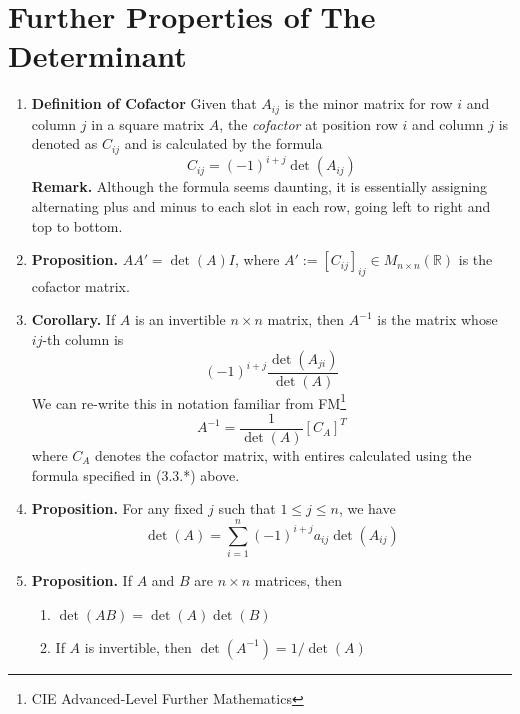 \documentclass[oneside, 12pt]{book}
\newcommand{\settag}[1]{\renewcommand{\theenumi}{#1}}
\newcommand{\R}{\mathbb{R}}
\newcommand{\tbf}[1]{\textbf{#1}}
\newcommand{\tit}[1]{\textit{#1}}
\newcommand{\para}[1]{\item \tbf{#1}}
\begin{document}
\section{Further Properties of The Determinant} 
\begin{enumerate}
    \settag{3.3.*}
    \para{Definition of Cofactor} Given that $A_{ij}$ is the minor matrix for row $i$ and column $j$ in a square matrix $A$, the \tit{cofactor} at position row $i$ and column $j$ is denoted as $C_{ij}$ and is calculated by the formula 
    \begin{equation*}
        C_{ij}=(-1)^{i+j}\det(A_{ij})
    \end{equation*}
    \tbf{Remark.} Although the formula seems daunting, it is essentially assigning alternating plus and minus to each slot in each row, going left to right and top to bottom.

    \settag{3.3.1}
    \para{Proposition.} $AA'=\det(A)I$, where $A':=\left[ C_{ij} \right]_{ij} \in M_{n \times n}(\R)$ is the cofactor matrix.
    
    \settag{3.3.2}
    \para{Corollary.} If $A$ is an invertible $n \times n$ matrix, then $A^{-1}$ is the matrix whose $ij$-th column is
    \begin{equation*}
        (-1)^{i+j}\frac{\det(A_{ji})}{\det(A)}
    \end{equation*}
    We can re-write this in notation familiar from FM\footnote{CIE Advanced-Level Further Mathematics}
    \begin{equation*}
        A^{-1} = \frac{1}{\det(A)}\left[C_A\right]^T
    \end{equation*}
    where $C_A$ denotes the cofactor matrix, with entires calculated using the formula specified in (3.3.*) above.
    
    \settag{3.3.4}
    \para{Proposition.} For any fixed $j$ such that $1 \leq j \leq n$, we have
    \begin{equation*}
        \det(A) = \sum_{i=1}^{n}(-1)^{i+j}a_{ij}\det(A_{ij})
    \end{equation*}
    
    \settag{3.3.7}
    \para{Proposition.} If $A$ and $B$ are $n\times n$ matrices, then
    \begin{enumerate}
        \item $\det(AB) = \det(A)\det(B)$
        \item If $A$ is invertible, then $\det(A^{-1}) = 1/\det(A)$
    \end{enumerate}
    

\end{enumerate}
\end{document}
